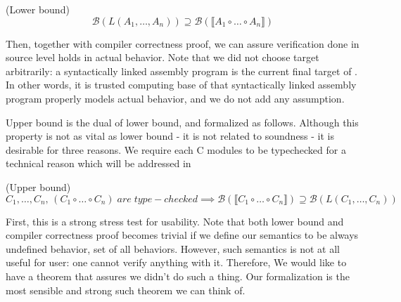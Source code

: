 {\begin{theorem} (Lower bound)
  \[
  \mathcal{B}(L(A_{1}, \ldots, A_{n})) \supseteq \mathcal{B}(\llbracket A_{1} \circ \ldots \circ A_{n} \rrbracket)
  \]
\end{theorem}


Then, together with compiler correctness proof,  we can assure verification done in source level holds in actual behavior.
Note that we did not choose target arbitrarily: a syntactically linked assembly program is the current final target of \cc{}.
In other words, it is trusted computing base of \cc{} that syntactically linked assembly program properly models actual behavior, and we do not add any assumption.


Upper bound is the dual of lower bound, and formalized as follows.
Although this property is not as vital as lower bound - it is not related to soundness - it is desirable for three reasons.
We require each C modules to be type\mymathhyphen{}checked for a technical reason which will be addressed in 

\begin{theorem} (Upper bound)
  \[
  C_{1}, \ldots, C_{n}, \, (C_{1} \circ \ldots \circ C_{n}) \; are \; type-checked \implies
  \mathcal{B}(\llbracket C_{1} \circ \ldots \circ C_{n} \rrbracket) \supseteq \mathcal{B}(L(C_{1}, \ldots, C_{n}))
  \]
\end{theorem}

First, this is a strong stress test for usability.
Note that both lower bound and compiler correctness proof becomes trivial if we define our semantics to be always undefined behavior, \ie{} set of all behaviors.
However, such semantics is not at all useful for user: one cannot verify anything with it.
Therefore, We would like to have a theorem that assures we didn't do such a thing.
Our formalization is the most sensible and strong such theorem we can think of.

}
